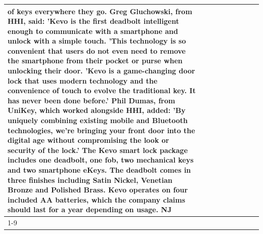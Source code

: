 \begin{table}[H]
\begin{tabular}{lllrlllll}
of keys everywhere they go. Greg Gluchowski, from HHI, said: 'Kevo is the first deadbolt intelligent enough to communicate with a smartphone and unlock with a simple touch. 'This technology is so convenient that users do not even need to remove the smartphone from their pocket or purse when unlocking their door. 'Kevo is a game-changing door lock that uses modern technology and the convenience of touch to evolve the traditional key. It has never been done before.' Phil Dumas, from UniKey, which worked alongside HHI, added: 'By uniquely combining existing mobile and Bluetooth technologies, we’re bringing your front door into the digital age without compromising the look or security of the lock.' The Kevo smart lock package includes one deadbolt, one fob, two mechanical keys and two smartphone eKeys. The deadbolt comes in three finishes including Satin Nickel, Venetian Bronze and Polished Brass. Kevo operates on four included AA batteries, which the company claims should last for a year depending on usage. NJ \\
\cline{1-9}

\end{tabular}
\end{table}
